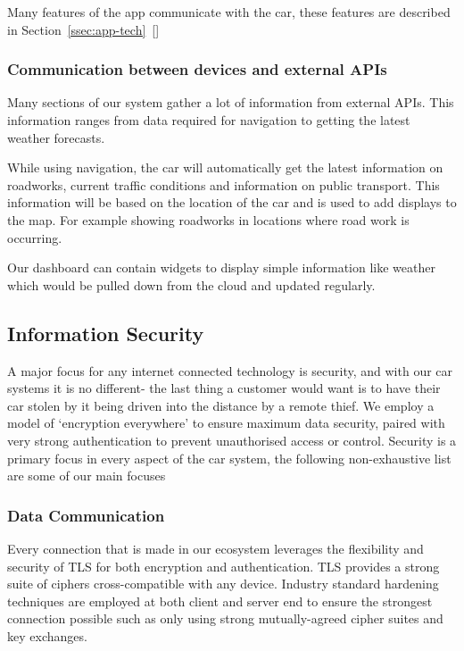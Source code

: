 \documentclass{article}
\begin{document}
Many features of the app communicate with the car, these features are described in Section~\ref{ssec:app-tech}~[]

\subsubsection{Communication between devices and external APIs}\label{sssec:devices-APIs}
Many sections of our system gather a lot of information from external APIs. This information ranges from data required for navigation to getting the latest weather forecasts.

While using navigation, the car will automatically get the latest information on roadworks, current traffic conditions and information on public transport. This information will be based on the location of the car and is used to add displays to the map. For example showing roadworks in locations where road work is occurring.

Our dashboard can contain widgets to display simple information like weather which would be pulled down from the cloud and updated regularly.

\subsection{Information Security}\label{ssec:information-security} %
A major focus for any internet connected technology is security, and with our car systems it is no different- the last thing a customer would want is to have their car stolen by it being driven into the distance by a remote thief. We employ a model of `encryption everywhere' to ensure maximum data security, paired with very strong authentication to prevent unauthorised access or control. Security is a primary focus in every aspect of the car system, the following non-exhaustive list are some of our main focuses

\subsubsection{Data Communication}
Every connection that is made in our ecosystem leverages the flexibility and security of TLS for both encryption and authentication. TLS provides a strong suite of ciphers cross-compatible with any device. Industry standard hardening techniques are employed at both client and server end to ensure the strongest connection possible such as only using strong mutually-agreed cipher suites and key exchanges.
\end{document}
